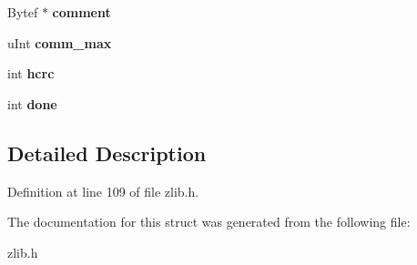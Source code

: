 \begin{DoxyCompactItemize}
\item 
\hypertarget{structgz__header__s_a1d4fd0807e838ce4bfde54aa021e18e9}{Bytef $\ast$ {\bfseries comment}}\label{structgz__header__s_a1d4fd0807e838ce4bfde54aa021e18e9}

\item 
\hypertarget{structgz__header__s_aa0529f45e5c08b3009cfc2a61a86aea0}{u\+Int {\bfseries comm\+\_\+max}}\label{structgz__header__s_aa0529f45e5c08b3009cfc2a61a86aea0}

\item 
\hypertarget{structgz__header__s_a29fa8de3acff8d8c7bad61dc924d8564}{int {\bfseries hcrc}}\label{structgz__header__s_a29fa8de3acff8d8c7bad61dc924d8564}

\item 
\hypertarget{structgz__header__s_ab8fd11f59b76a7d031e24bede8679d9d}{int {\bfseries done}}\label{structgz__header__s_ab8fd11f59b76a7d031e24bede8679d9d}

\end{DoxyCompactItemize}


\subsection{Detailed Description}


Definition at line 109 of file zlib.\+h.



The documentation for this struct was generated from the following file\+:\begin{DoxyCompactItemize}
\item 
zlib.\+h\end{DoxyCompactItemize}
